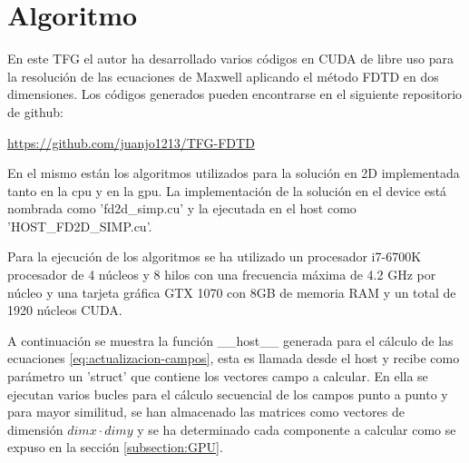 \documentclass[11pt,a4paper,twoside,pdf]{article}
\numberwithin{equation}{section}
\begin{document}
\section{Algoritmo}
En este TFG el autor ha desarrollado varios códigos en CUDA de libre uso para la resolución de las ecuaciones de Maxwell aplicando el método FDTD en dos dimensiones. Los códigos generados pueden encontrarse en el siguiente repositorio de github:

\url{https://github.com/juanjo1213/TFG-FDTD}

En el mismo están los algoritmos utilizados para la solución en 2D implementada tanto en la cpu y en la gpu. La implementación de la solución en el device está nombrada como 'fd2d\_simp.cu' y la ejecutada en el host como 'HOST\_FD2D\_SIMP.cu'.



Para la ejecución de los algoritmos se ha utilizado un procesador i7-6700K procesador de 4 núcleos y 8 hilos con una frecuencia máxima de 4.2 GHz por núcleo y una tarjeta gráfica GTX 1070 con 8GB de memoria RAM y un total de 1920 núcleos CUDA. 

A continuación se muestra la función \_\_host\_\_ generada para el cálculo de las ecuaciones \ref{eq:actualizacion-campos}, esta es llamada desde el host y recibe como parámetro un 'struct' que contiene los vectores campo a calcular. En ella se ejecutan varios bucles para el cálculo secuencial de los campos punto a punto y para mayor similitud, se han almacenado las matrices como vectores de dimensión $dimx\cdot dimy$ y se ha determinado cada componente a calcular como se expuso en la sección \ref{subsection:GPU}. 
\end{document}
